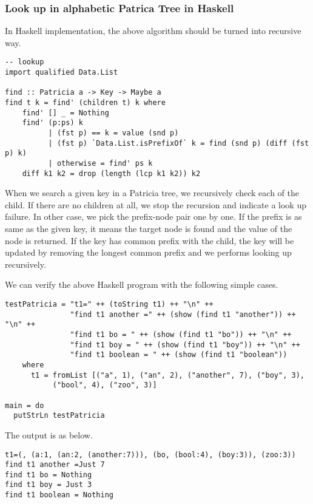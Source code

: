 \documentclass{article}
\begin{document}
\subsubsection*{Look up in alphabetic Patrica Tree in Haskell}
In Haskell implementation, the above algorithm should be turned
into recursive way.

\lstset{language=Haskell}
\begin{lstlisting}
-- lookup
import qualified Data.List

find :: Patricia a -> Key -> Maybe a
find t k = find' (children t) k where
    find' [] _ = Nothing
    find' (p:ps) k
          | (fst p) == k = value (snd p)
          | (fst p) `Data.List.isPrefixOf` k = find (snd p) (diff (fst p) k)
          | otherwise = find' ps k
    diff k1 k2 = drop (length (lcp k1 k2)) k2
\end{lstlisting}

When we search a given key in a Patricia tree, we recursively check each
of the child. If there are no children at all, we stop the recursion and
indicate a look up failure. In other case, we pick the prefix-node pair
one by one. If the prefix is as same as the given key, it means the target
node is found and the value of the node is returned. If the key has common
prefix with the child, the key will be updated by removing the longest
common prefix and we performs looking up recursively.

We can verify the above Haskell program with the following simple cases.

\begin{lstlisting}
testPatricia = "t1=" ++ (toString t1) ++ "\n" ++
               "find t1 another =" ++ (show (find t1 "another")) ++ "\n" ++
               "find t1 bo = " ++ (show (find t1 "bo")) ++ "\n" ++
               "find t1 boy = " ++ (show (find t1 "boy")) ++ "\n" ++
               "find t1 boolean = " ++ (show (find t1 "boolean"))
    where
      t1 = fromList [("a", 1), ("an", 2), ("another", 7), ("boy", 3),
           ("bool", 4), ("zoo", 3)]

main = do
  putStrLn testPatricia
\end{lstlisting}

The output is as below.

\begin{verbatim}
t1=(, (a:1, (an:2, (another:7))), (bo, (bool:4), (boy:3)), (zoo:3))
find t1 another =Just 7
find t1 bo = Nothing
find t1 boy = Just 3
find t1 boolean = Nothing
\end{verbatim}
\end{document}
